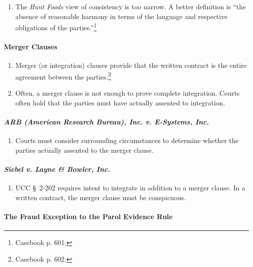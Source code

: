 \begin{enumerate}
    \item The \emph{Hunt Foods} view of consistency is too narrow. A better 
    definition is ``the absence of reasonable harmony in terms of the language 
    and respective obligations of the parties.''\footnote{Casebook p. 601.}
\end{enumerate}

\paragraph{Merger Clauses}

\begin{enumerate}
    \item Merger (or integration) clauses provide that the written contract is 
    the entire agreement between the parties.\footnote{Casebook p. 602.}
    \item Often, a merger clause is not enough to prove complete integration. 
    Courts often hold that the parties must have actually assented to 
    integration.
\end{enumerate}

\paragraph{\emph{ARB (American Research Bureau), Inc. v. E-Systems, Inc.}}

\begin{enumerate}
    \item Courts must consider surrounding circumstances to determine whether 
    the parties actually assented to the merger clause.
\end{enumerate}

\paragraph{\emph{Siebel v. Layne \& Bowler, Inc.}}

\begin{enumerate}
    \item UCC \S\ 2-202 requires intent to integrate in addition to a merger 
    clause. In a written contract, the merger clause must be conspicuous.
\end{enumerate}

\paragraph{The Fraud Exception to the Parol Evidence Rule}

